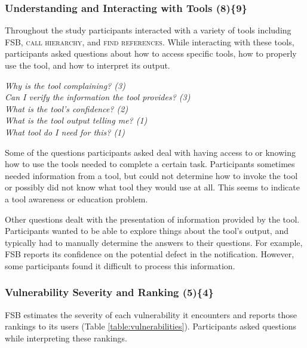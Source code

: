 \documentclass{acm_proc_article-sp}
\begin{document}

\subsubsection{\textbf{Understanding and Interacting with Tools (8)\{9\}}}\label{uit}

Throughout the study participants interacted with a variety of tools including FSB, \textsc{call hierarchy}, and \textsc{find references}. 
While interacting with these tools, participants asked questions about how to access specific tools, how to properly use the tool, and how to interpret its output. 


\noindent\emph{Why is the tool complaining? (3)} \\
\emph{Can I verify the information the tool provides? (3)} \\
\emph{What is the tool's confidence? (2)} \\
\emph{What is the tool output telling me? (1)} \\
\emph{What tool do I need for this? (1)} 


 
Some of the questions participants asked deal with having access to or knowing how to use the tools needed to complete a certain task. 
Participants sometimes needed information from a tool, but could not determine how to invoke the tool or possibly did not know what tool they would use at all. 
This seems to indicate a tool awareness or education problem.

Other questions dealt with the presentation of information provided by the tool. 
Participants wanted to be able to explore things about the tool's output, and typically had to manually determine the answers to their questions. 
For example, FSB reports its confidence on the potential defect in the notification. 
However, some participants found it difficult to process this information.




\subsubsection{\textbf{Vulnerability Severity and Ranking (5)\{4\}}}\label{bsr}

FSB estimates the severity of each vulnerability it encounters and reports those rankings to its users (Table \ref{table:vulnerabilities}). 
Participants asked questions while interpreting these rankings.
\end{document}
